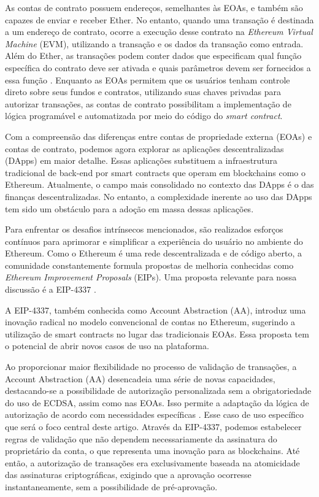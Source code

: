 \documentclass[12pt]{article}
\begin{document}
As contas de contrato possuem endereços, semelhantes às EOAs, e também são capazes de enviar e
receber Ether. No entanto, quando uma transação é destinada a um endereço de contrato, ocorre a
execução desse contrato na \textit{Ethereum Virtual Machine} (EVM), utilizando a transação e os
dados da transação como entrada. Além do Ether, as transações podem conter dados que especificam
qual função específica do contrato deve ser ativada e quais parâmetros devem ser fornecidos a essa
função \cite{6}. Enquanto as EOAs permitem que os usuários tenham controle direto sobre seus fundos
e contratos, utilizando suas chaves privadas para autorizar transações, as contas de contrato
possibilitam a implementação de lógica programável e automatizada por meio do código do \textit
{smart contract}.

Com a compreensão das diferenças entre contas de propriedade externa (EOAs) e contas de contrato,
podemos agora explorar as aplicações descentralizadas (DApps) em maior detalhe. Essas aplicações
substituem a infraestrutura tradicional de back-end por smart contracts que operam em blockchains
como o Ethereum. Atualmente, o campo mais consolidado no contexto das DApps é o das finanças
descentralizadas. No entanto, a complexidade inerente ao uso das DApps tem sido um obstáculo para a
adoção em massa dessas aplicações.

Para enfrentar os desafios intrínsecos mencionados, são realizados esforços contínuos para
aprimorar e simplificar a experiência do usuário no ambiente do Ethereum. Como o Ethereum é uma
rede descentralizada e de código aberto, a comunidade constantemente formula propostas de melhoria
conhecidas como \textit{Ethereum Improvement Proposals} (EIPs). Uma proposta relevante para nossa
discussão é a EIP-4337 \cite{5}.

A EIP-4337, também conhecida como Account Abstraction (AA), introduz uma inovação radical no modelo
convencional de contas no Ethereum, sugerindo a utilização de smart contracts no lugar das
tradicionais EOAs. Essa proposta tem o potencial de abrir novos casos de uso na plataforma.

Ao proporcionar maior flexibilidade no processo de validação de transações, a Account Abstraction
(AA) desencadeia uma série de novas capacidades, destacando-se a possibilidade de autorização
personalizada sem a obrigatoriedade do uso de ECDSA, assim como nas EOAs. Isso permite a adaptação
da lógica de autorização de acordo com necessidades específicas \cite{1}. Esse caso de uso
específico que será o foco central deste artigo. Através da EIP-4337, podemos estabelecer regras de
validação que não dependem necessariamente da assinatura do proprietário da conta, o que representa
uma inovação para as blockchains. Até então, a autorização de transações era exclusivamente baseada
na atomicidade das assinaturas criptográficas, exigindo que a aprovação ocorresse instantaneamente,
sem a possibilidade de pré-aprovação.
\end{document}
